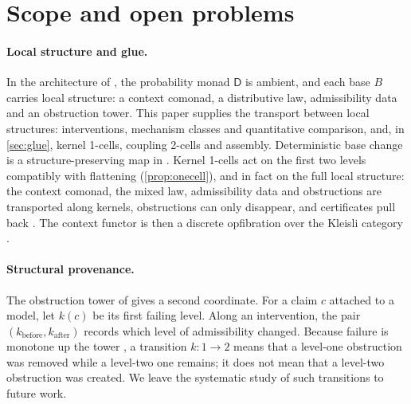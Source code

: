 \documentclass[11pt]{article}
\theoremstyle{definition}
\theoremstyle{remark}
\newcommand{\D}{\mathsf{D}}
\begin{document}
\section{Scope and open problems}\label{sec:scope}

\paragraph{Local structure and glue.} In the architecture of \cite{Awasthi-Tower}, the probability monad
$\D$ is ambient, and each base $B$ carries local structure: a context comonad, a distributive law,
admissibility data and an obstruction tower. This paper supplies the transport between local
structures: interventions, mechanism classes and quantitative comparison, and, in \cref{sec:glue},
kernel 1-cells, coupling 2-cells and assembly. Deterministic base change is a structure-preserving map
in \cite[Prop.~9.13]{Awasthi-Tower}. Kernel 1-cells act on the first two levels compatibly with
flattening (\cref{prop:onecell}), and in fact on the full local structure: the context comonad, the mixed law,
admissibility data and obstructions are transported along kernels, obstructions can only disappear, and certificates
pull back \cite[Prop.~9.14, Cor.~9.15]{Awasthi-Tower}. The context functor is then a discrete opfibration over the
Kleisli category \cite[\S3]{Awasthi-Conditionals}.

\paragraph{Structural provenance.} The obstruction tower of \cite[\S10]{Awasthi-Tower} gives a second
coordinate. For a claim $c$ attached to a model, let $k(c)$ be its first failing level. Along an
intervention, the pair $(k_{\mathrm{before}},k_{\mathrm{after}})$ records which level of admissibility
changed. Because failure is monotone up the tower \cite[Thm.~10.5]{Awasthi-Tower}, a transition
$k:1\to2$ means that a level-one obstruction was removed while a level-two one remains; it does not
mean that a level-two obstruction was created. We leave the systematic study of such transitions to
future work.
\end{document}
